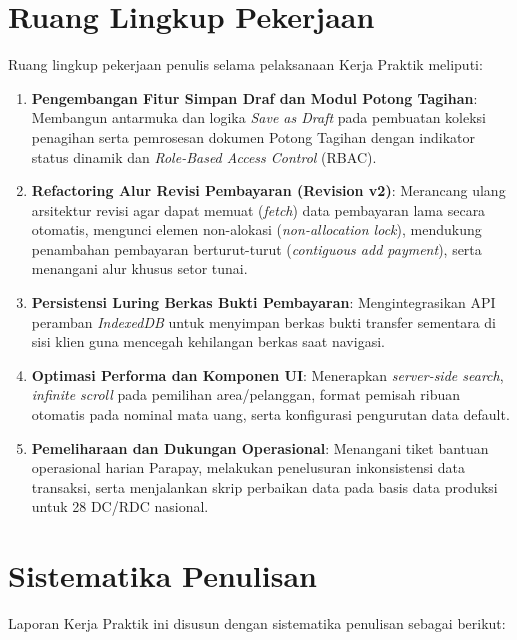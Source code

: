\section{Ruang Lingkup Pekerjaan}
Ruang lingkup pekerjaan penulis selama pelaksanaan Kerja Praktik meliputi:
\begin{enumerate}[label=\arabic*)]
  \item \textbf{Pengembangan Fitur Simpan Draf dan Modul Potong Tagihan}: Membangun antarmuka dan logika \textit{Save as Draft} pada pembuatan koleksi penagihan serta pemrosesan dokumen Potong Tagihan dengan indikator status dinamik dan \textit{Role-Based Access Control} (RBAC).
  \item \textbf{Refactoring Alur Revisi Pembayaran (Revision v2)}: Merancang ulang arsitektur revisi agar dapat memuat (\textit{fetch}) data pembayaran lama secara otomatis, mengunci elemen non-alokasi (\textit{non-allocation lock}), mendukung penambahan pembayaran berturut-turut (\textit{contiguous add payment}), serta menangani alur khusus setor tunai.
  \item \textbf{Persistensi Luring Berkas Bukti Pembayaran}: Mengintegrasikan API peramban \textit{IndexedDB} untuk menyimpan berkas bukti transfer sementara di sisi klien guna mencegah kehilangan berkas saat navigasi.
  \item \textbf{Optimasi Performa dan Komponen UI}: Menerapkan \textit{server-side search}, \textit{infinite scroll} pada pemilihan area/pelanggan, format pemisah ribuan otomatis pada nominal mata uang, serta konfigurasi pengurutan data default.
  \item \textbf{Pemeliharaan dan Dukungan Operasional}: Menangani tiket bantuan operasional harian Parapay, melakukan penelusuran inkonsistensi data transaksi, serta menjalankan skrip perbaikan data pada basis data produksi untuk 28 DC/RDC nasional.
\end{enumerate}

\section{Sistematika Penulisan}
Laporan Kerja Praktik ini disusun dengan sistematika penulisan sebagai berikut:

